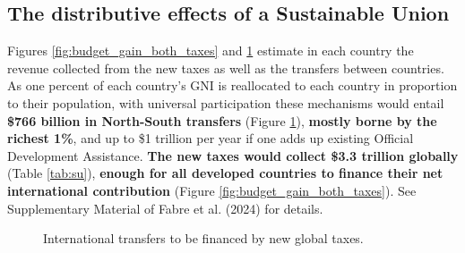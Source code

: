 \documentclass[12pt,english]{article}
\begin{document}
\subsection{The distributive effects of a Sustainable Union\label{subsec:distributive}}

Figures \ref{fig:budget_gain_both_taxes} and \ref{fig:gain_both_taxes} estimate in each country the revenue collected from the new taxes as well as the transfers between countries. %
As one percent of each country's GNI is reallocated to each country in proportion to their population, with universal participation these mechanisms would entail \textbf{\$766 billion in North-South transfers} (Figure \ref{fig:gain_both_taxes}), \textbf{mostly borne by the richest 1\%}, and up to \$1 trillion per year if one adds up existing Official Development Assistance. \textbf{The new taxes would collect \$3.3 trillion globally} (Table \ref{tab:su}), \textbf{enough for all developed countries to finance their net international contribution} (Figure \ref{fig:budget_gain_both_taxes}). See Supplementary Material of Fabre et al. (2024)\cite{fabre_shared_2024} for details.

\begin{figure}[h!] 
  \caption{International transfers to be financed by new global taxes.}\label{fig:gain_both_taxes}
\end{figure}
\end{document}
